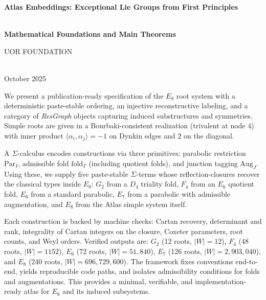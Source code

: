\documentclass[12pt]{article}
\begin{document}
\begin{titlepage}
    \centering
 
    
  \LARGE\textbf{Atlas Embeddings: Exceptional Lie Groups from First Principles}
   \vspace*{0.5em}
  {\Large\bfseries \\Mathematical Foundations and Main Theorems \par}
   \vspace{1cm}
     \Large{UOR FOUNDATION} \\
  \vspace{1cm}
   \\ \vspace{1cm} 
    {\normalsize October 2025 \par}
    \vfill

   
    \vspace{0.5em}
    \begin{minipage}{0.85\textwidth}
        \small
       We present a publication-ready specification of the $E_8$ root system with a deterministic paste-stable ordering, an injective reconstructive labeling, and a category of \emph{ResGraph} objects capturing induced substructures and symmetries. Simple roots are given in a Bourbaki-consistent realization (trivalent at node $4$) with inner product $\langle\alpha_i,\alpha_j\rangle=-1$ on Dynkin edges and $2$ on the diagonal.

A $\Sigma$-calculus encodes constructions via three primitives: parabolic restriction $\mathrm{Par}_I$, admissible fold $\mathrm{fold}_\Gamma$ (including quotient folds), and junction tagging $\mathrm{Aug}_J$. Using these, we supply five paste-stable $\Sigma$-terms whose reflection-closures recover the classical types inside $E_8$: $G_2$ from a $D_4$ triality fold, $F_4$ from an $E_6$ quotient fold, $E_6$ from a standard parabolic, $E_7$ from a parabolic with admissible augmentation, and $E_8$ from the Atlas simple system itself.

Each construction is backed by machine checks: Cartan recovery, determinant and rank, integrality of Cartan integers on the closure, Coxeter parameters, root counts, and Weyl orders. Verified outputs are: $G_2$ (12 roots, $|W|=12$), $F_4$ (48 roots, $|W|=1152$), $E_6$ (72 roots, $|W|=51{,}840$), $E_7$ (126 roots, $|W|=2{,}903{,}040$), and $E_8$ (240 roots, $|W|=696{,}729{,}600$). The framework fixes conventions end-to-end, yields reproducible code paths, and isolates admissibility conditions for folds and augmentations. This provides a minimal, verifiable, and implementation-ready atlas for $E_8$ and its induced subsystems.


    \end{minipage}

\end{titlepage}
\clearpage
\clearpage
\end{document}
